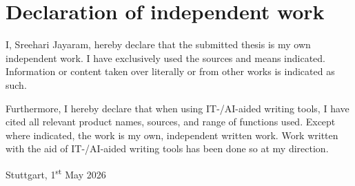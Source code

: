 \section*{Declaration of independent work}
I, Sreehari Jayaram, hereby declare that the submitted thesis is my own independent work. I have exclusively used the sources and means indicated. Information or content taken over literally or from other works is indicated as such. 

Furthermore, I hereby declare that when using IT-/AI-aided writing tools, I have cited all relevant product names, sources, and range of functions used. Except where indicated, the work is my own, independent written work. Work written with the aid of IT-/AI-aided writing tools has been done so at my direction.

\vspace{5em}
Stuttgart, 1\textsuperscript{st} May 2026
\vspace{5em}
\hrulefill \\
